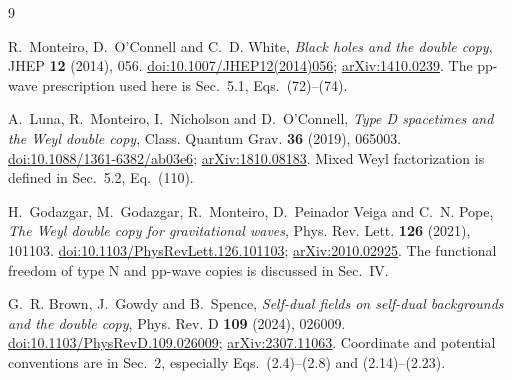 \documentclass[11pt]{article}
\numberwithin{equation}{section}
\theoremstyle{remark}
\begin{document}
\begin{thebibliography}{9}

R.~Monteiro, D.~O'Connell and C.~D. White,
\emph{Black holes and the double copy},
JHEP \textbf{12} (2014), 056.
\href{https://doi.org/10.1007/JHEP12(2014)056}{doi:10.1007/JHEP12(2014)056};
\href{https://arxiv.org/abs/1410.0239}{arXiv:1410.0239}.
The pp-wave prescription used here is Sec.~5.1, Eqs.~(72)--(74).

A.~Luna, R.~Monteiro, I.~Nicholson and D.~O'Connell,
\emph{Type D spacetimes and the Weyl double copy},
Class. Quantum Grav. \textbf{36} (2019), 065003.
\href{https://doi.org/10.1088/1361-6382/ab03e6}{doi:10.1088/1361-6382/ab03e6};
\href{https://arxiv.org/abs/1810.08183}{arXiv:1810.08183}.
Mixed Weyl factorization is defined in Sec.~5.2, Eq.~(110).

H.~Godazgar, M.~Godazgar, R.~Monteiro, D.~Peinador Veiga and C.~N. Pope,
\emph{The Weyl double copy for gravitational waves},
Phys. Rev. Lett. \textbf{126} (2021), 101103.
\href{https://doi.org/10.1103/PhysRevLett.126.101103}{doi:10.1103/PhysRevLett.126.101103};
\href{https://arxiv.org/abs/2010.02925}{arXiv:2010.02925}.
The functional freedom of type N and pp-wave copies is discussed in Sec.~IV.

G.~R. Brown, J.~Gowdy and B.~Spence,
\emph{Self-dual fields on self-dual backgrounds and the double copy},
Phys. Rev. D \textbf{109} (2024), 026009.
\href{https://doi.org/10.1103/PhysRevD.109.026009}{doi:10.1103/PhysRevD.109.026009};
\href{https://arxiv.org/abs/2307.11063}{arXiv:2307.11063}.
Coordinate and potential conventions are in Sec.~2, especially
Eqs.~(2.4)--(2.8) and (2.14)--(2.23).

\end{thebibliography}
\end{document}
